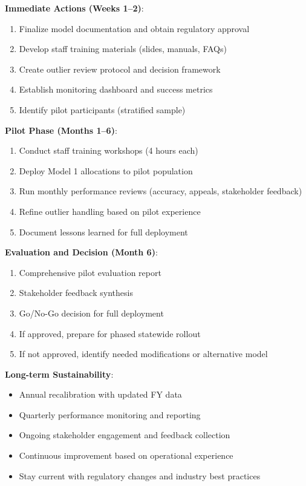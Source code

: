 \textbf{Immediate Actions (Weeks 1--2)}:
\begin{enumerate}
    \item Finalize model documentation and obtain regulatory approval
    \item Develop staff training materials (slides, manuals, FAQs)
    \item Create outlier review protocol and decision framework
    \item Establish monitoring dashboard and success metrics
    \item Identify pilot participants (stratified sample)
\end{enumerate}

\textbf{Pilot Phase (Months 1--6)}:
\begin{enumerate}
    \item Conduct staff training workshops (4 hours each)
    \item Deploy Model 1 allocations to pilot population
    \item Run monthly performance reviews (accuracy, appeals, stakeholder feedback)
    \item Refine outlier handling based on pilot experience
    \item Document lessons learned for full deployment
\end{enumerate}

\textbf{Evaluation and Decision (Month 6)}:
\begin{enumerate}
    \item Comprehensive pilot evaluation report
    \item Stakeholder feedback synthesis
    \item Go/No-Go decision for full deployment
    \item If approved, prepare for phased statewide rollout
    \item If not approved, identify needed modifications or alternative model
\end{enumerate}

\textbf{Long-term Sustainability}:
\begin{itemize}
    \item Annual recalibration with updated FY data
    \item Quarterly performance monitoring and reporting
    \item Ongoing stakeholder engagement and feedback collection
    \item Continuous improvement based on operational experience
    \item Stay current with regulatory changes and industry best practices
\end{itemize}

